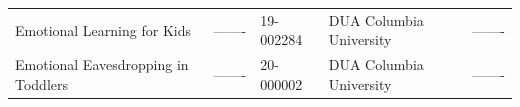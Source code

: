 \documentclass[]{book}
\begin{document}
\begin{longtable}[]{@{}lllll@{}}
\begin{minipage}[t]{0.32\columnwidth}\raggedright
Emotional Learning for Kids\strut
\end{minipage} & \begin{minipage}[t]{0.21\columnwidth}\raggedright
-------\strut
\end{minipage} & \begin{minipage}[t]{0.13\columnwidth}\raggedright
19-002284\strut
\end{minipage} & \begin{minipage}[t]{0.10\columnwidth}\raggedright
DUA Columbia University\strut
\end{minipage} & \begin{minipage}[t]{0.10\columnwidth}\raggedright
-------\strut
\end{minipage}\tabularnewline
\begin{minipage}[t]{0.32\columnwidth}\raggedright
Emotional Eavesdropping in Toddlers\strut
\end{minipage} & \begin{minipage}[t]{0.21\columnwidth}\raggedright
-------\strut
\end{minipage} & \begin{minipage}[t]{0.13\columnwidth}\raggedright
20-000002\strut
\end{minipage} & \begin{minipage}[t]{0.10\columnwidth}\raggedright
DUA Columbia University\strut
\end{minipage} & \begin{minipage}[t]{0.10\columnwidth}\raggedright
-------\strut
\end{minipage}\tabularnewline
\bottomrule
\end{longtable}


\end{document}
